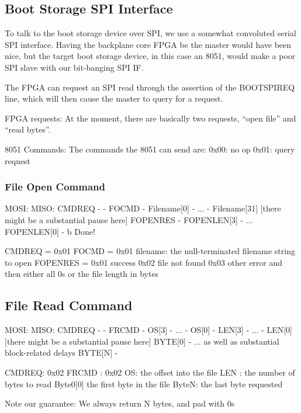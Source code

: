 \subsection{Boot Storage SPI Interface}

To talk to the boot storage device over SPI, we use a somewhat
convoluted serial SPI interface. Having the backplane core FPGA be the
master would have been nice, but the target boot storage device, in this
case an 8051, would make a poor SPI slave with our bit-banging SPI IF. 

The FPGA can request an SPI read through the assertion of the
BOOTSPIREQ line, which will then cause the master to query for a
request.

FPGA requests: At the moment, there are basically two requests, ``open
file'' and ``read bytes''.

8051 Commands: The commands the 8051 can send are: 
0x00: no op
0x01: query request

\subsubsection{File Open Command}
MOSI:          MISO:
CMDREQ          - 
  -            FOCMD
  -            Filename[0]
  -             ...
  -            Filename[31]
     [there might be a substantial pause here]
FOPENRES         -
FOPENLEN[3]      -
...
FOPENLEN[0]      - 
b
Done!


CMDREQ = 0x01
FOCMD  = 0x01
filename: the null-terminated filename string to open
FOPENRES = 0x01 success
           0x02 file not found
           0x03 other error
and then either all 0s or the file length in bytes


\subsection{File Read Command}
MOSI:           MISO:
CMDREQ            -
  -             FRCMD
  -              OS[3]
  -              ...
  -              OS[0]
  -             LEN[3]
  -             ... 
  -             LEN[0]
   [there might be a substantial pause here]
BYTE[0]           -
 ...              as well as substantial block-related delays
BYTE[N]           - 
  
CMDREQ: 0x02
FRCMD : 0x02
OS: the offset into the file
LEN : the number of bytes to read
Byte0[0] the first byte in the file
ByteN: the last byte requested

Note our guarantee: We always return N bytes, and pad with 0s


